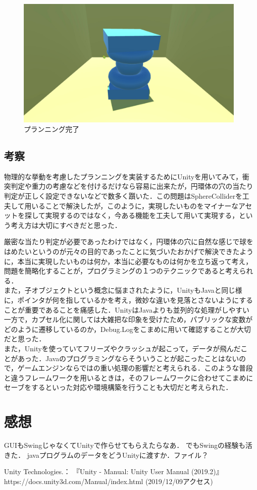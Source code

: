 \documentclass[12pt]{jarticle}
\begin{document}
\begin{figure}[!hbt]
  	\begin{center}
  		\includegraphics[scale=0.2]{images/bwp7.jpg}
	\end{center}
  	\caption{プランニング完了}
\end{figure}
\clearpage

\subsection{考察}
物理的な挙動を考慮したプランニングを実装するためにUnityを用いてみて，衝突判定や重力の考慮などを付けるだけなら容易に出来たが，円環体の穴の当たり判定が正しく設定できないなどで数多く躓いた．この問題はSphereColliderを工夫して用いることで解決したが，このように，実現したいものをマイナーなアセットを探して実現するのではなく，今ある機能を工夫して用いて実現する，という考え方は大切にすべきだと思った．

厳密な当たり判定が必要であったわけではなく，円環体の穴に自然な感じで球をはめたいというのが元々の目的であったことに気づいたおかげで解決できたように，本当に実現したいものは何か，本当に必要なものは何かを立ち返って考え，問題を簡略化することが，プログラミングの１つのテクニックであると考えられる． \\

また，子オブジェクトという概念に悩まされたように，UnityもJavaと同じ様に，ポインタが何を指しているかを考え，微妙な違いを見落とさないようにすることが重要であることを痛感した．UnityはJavaよりも並列的な処理がしやすい一方で，カプセル化に関しては大雑把な印象を受けたため，パブリックな変数がどのように遷移しているのか，Debug.Logをこまめに用いて確認することが大切だと思った． \\

また，Unityを使っていてフリーズやクラッシュが起こって，データが飛んだことがあった．Javaのプログラミングならそういうことが起こったことはないので，ゲームエンジンならではの重い処理の影響だと考えられる．このような普段と違うフレームワークを用いるときは，そのフレームワークに合わせてこまめにセーブをするといった対応や環境構築を行うことも大切だと考えられた．

\section{感想}
GUIもSwingじゃなくてUnityで作らせてもらえたらなあ．
でもSwingの経験も活きた．
javaプログラムのデータをどうUnityに渡すか．ファイル？


\begin{thebibliography}{99}
Unity Technologies.： 『Unity - Manual: Unity User Manual (2019.2)』 https://docs.unity3d.com/Manual/index.html (2019/12/09アクセス) \\
\end{thebibliography}
\end{document}
